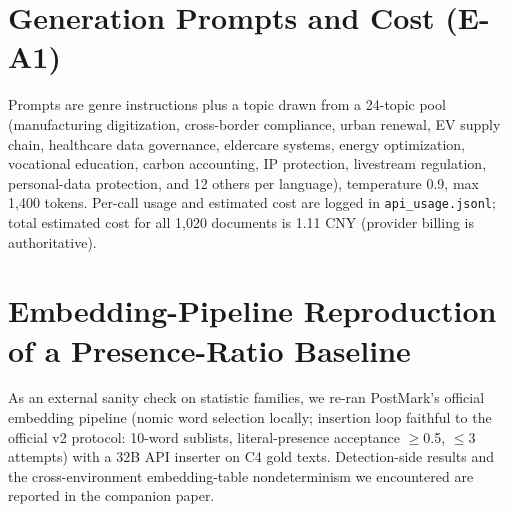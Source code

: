 \section{Generation Prompts and Cost (E-A1)}
Prompts are genre instructions plus a topic drawn from a 24-topic pool
(manufacturing digitization, cross-border compliance, urban renewal,
EV supply chain, healthcare data governance, eldercare systems, energy
optimization, vocational education, carbon accounting, IP protection,
livestream regulation, personal-data protection, and 12 others per
language), temperature 0.9, max 1,400 tokens. Per-call usage and estimated
cost are logged in \texttt{api\_usage.jsonl}; total estimated cost for all
1,020 documents is 1.11 CNY (provider billing is authoritative).

\section{Embedding-Pipeline Reproduction of a Presence-Ratio Baseline}
As an external sanity check on statistic families, we re-ran PostMark's
official embedding pipeline (nomic word selection locally; insertion loop
faithful to the official v2 protocol: 10-word sublists, literal-presence
acceptance $\ge$0.5, $\le$3 attempts) with a 32B API inserter on C4 gold
texts. Detection-side results and the cross-environment embedding-table
nondeterminism we encountered are reported in the companion paper.
